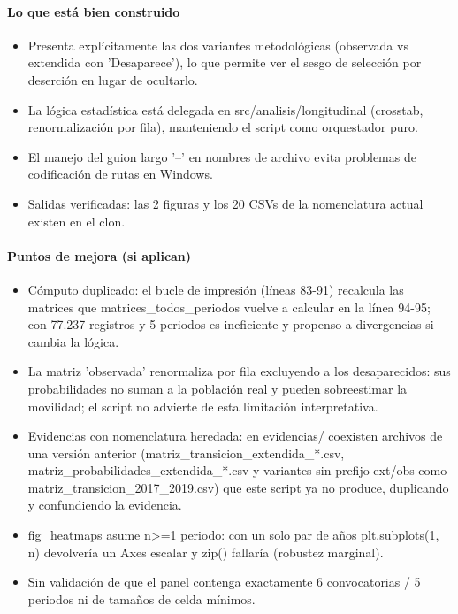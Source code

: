 \paragraph{Lo que está bien construido}
\begin{itemize}
  \item Presenta explícitamente las dos variantes metodológicas (observada vs extendida con 'Desaparece'), lo que permite ver el sesgo de selección por deserción en lugar de ocultarlo.
  \item La lógica estadística está delegada en src/analisis/longitudinal (crosstab, renormalización por fila), manteniendo el script como orquestador puro.
  \item El manejo del guion largo '--' en nombres de archivo evita problemas de codificación de rutas en Windows.
  \item Salidas verificadas: las 2 figuras y los 20 CSVs de la nomenclatura actual existen en el clon.
\end{itemize}

\paragraph{Puntos de mejora (si aplican)}
\begin{itemize}
  \item Cómputo duplicado: el bucle de impresión (líneas 83-91) recalcula las matrices que matrices\_todos\_periodos vuelve a calcular en la línea 94-95; con 77.237 registros y 5 periodos es ineficiente y propenso a divergencias si cambia la lógica.
  \item La matriz 'observada' renormaliza por fila excluyendo a los desaparecidos: sus probabilidades no suman a la población real y pueden sobreestimar la movilidad; el script no advierte de esta limitación interpretativa.
  \item Evidencias con nomenclatura heredada: en evidencias/ coexisten archivos de una versión anterior (matriz\_transicion\_extendida\_*.csv, matriz\_probabilidades\_extendida\_*.csv y variantes sin prefijo ext/obs como matriz\_transicion\_2017\_2019.csv) que este script ya no produce, duplicando y confundiendo la evidencia.
  \item fig\_heatmaps asume n>=1 periodo: con un solo par de años plt.subplots(1, n) devolvería un Axes escalar y zip() fallaría (robustez marginal).
  \item Sin validación de que el panel contenga exactamente 6 convocatorias / 5 periodos ni de tamaños de celda mínimos.
\end{itemize}

